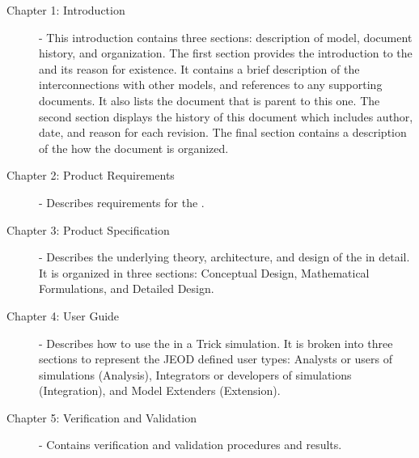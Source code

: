 \begin{description}

\item[Chapter 1: Introduction] - 
This introduction contains three sections: description of model, document history, and organization.  
The first section provides the introduction to the \ModelDesc and its reason 
for existence.  It contains a brief description of the interconnections with other models, and 
references to any supporting documents. It also lists the document that is parent to this one.
The second section displays the history of this document which includes
author, date, and reason for each revision.  The final
section contains a description of the how the document is organized.

\item[Chapter 2: Product Requirements] - 
Describes requirements for the \ModelDesc.

\item[Chapter 3: Product Specification] - 
Describes the underlying theory, architecture, and design of the \ModelDesc in
detail.  It is organized in 
three sections: Conceptual Design, Mathematical Formulations, and Detailed Design.

\item[Chapter 4: User Guide] - 
Describes how to use the \ModelDesc in a Trick simulation.  It is broken into three sections to represent the JEOD 
defined user types: Analysts or users of simulations (Analysis), Integrators or developers of simulations (Integration),
and Model Extenders (Extension).

\item[Chapter 5: Verification and Validation] -  
Contains \ModelDesc verification and validation procedures and results.

\end{description}
